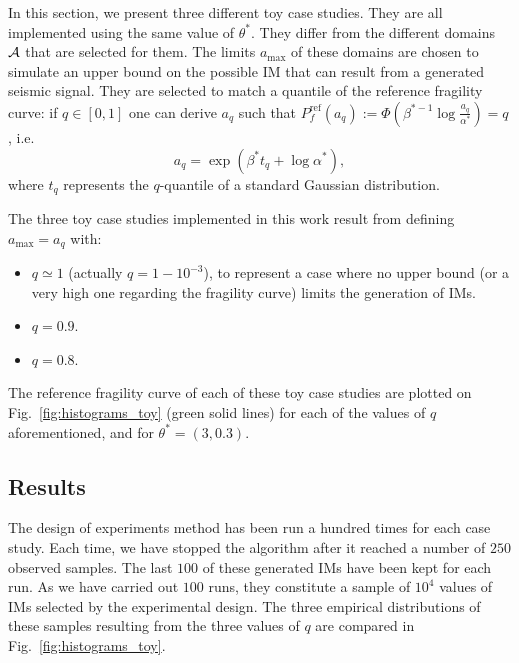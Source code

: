     In this section, we present three different toy case studies. They are all implemented using the same value of $\theta^\ast$. 
    They differ from the different domains $\mathcal{A}$ that are selected for them.
    The limits $a_{\text{max}}$ of these domains are chosen to simulate an upper bound 
    on the possible IM that can result from a generated seismic signal.
    They are selected to match a quantile of the reference fragility curve: if $q\in[0,1]$ one can derive $a_q$ such that $P^{\text{ref}}_f(a_q):=\Phi\left(\beta^{\ast -1}\log\frac{a_q}{\alpha^{\ast}}\right)=q$, i.e.
        \begin{equation}
            a_q = \exp\left( \beta^\ast t_q+\log\alpha^\ast \right),
        \end{equation}
    where $t_q$ represents the $q$-quantile of a standard Gaussian distribution.
    
    The three toy case studies implemented in this work result from defining $a_{\text{max}}=a_q$ with:
    \begin{itemize}
        \item $q\simeq1$ (actually $q=1-10^{-3}$), to represent a case where no upper bound (or a very high one regarding the fragility curve) limits the generation of IMs. %
        \item $q=0.9$.
        \item $q=0.8$.
    \end{itemize}
    The reference fragility curve of each of these toy case studies are plotted on Fig.~\ref{fig:histograms_toy} (green solid lines) for each of the values of $q$ aforementioned, and for $\theta^\ast=(3,0.3)$. 
    
    
    
    
    
    \subsection{Results}
    
    The design of experiments method has been run a hundred times for each case study. Each time, we have stopped the algorithm after it reached a number of $250$ observed samples.
    The last $100$ of these generated IMs have been kept for each run. As we have carried out $100$ runs, they constitute a sample of $10^4$ values of IMs selected by the experimental design.
    The three empirical distributions of these samples resulting from the three values of $q$ are compared in Fig.~\ref{fig:histograms_toy}.
    
